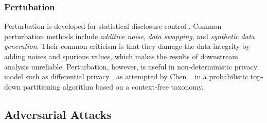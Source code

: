 \subsubsection{Pertubation}

Perturbation is developed for statistical disclosure control
\cite{FungWCY10:Survey}. Common perturbation methods include {\em additive
noise}, {\em data swapping}, and {\em synthetic data generation}. Their
common criticism is that they damage the data integrity by adding noises and
spurious values, which makes the results of downstream analysis unreliable.
Perturbation, however, is useful in non-deterministic privacy model such as
differential privacy \cite{Dwork08:diff:survey}, as
attempted by Chen \etal~ \cite{ChenMFDX11:Diff} in a probabilistic top-down
partitioning algorithm based on a context-free taxonomy.
%

\subsection{Adversarial Attacks}

